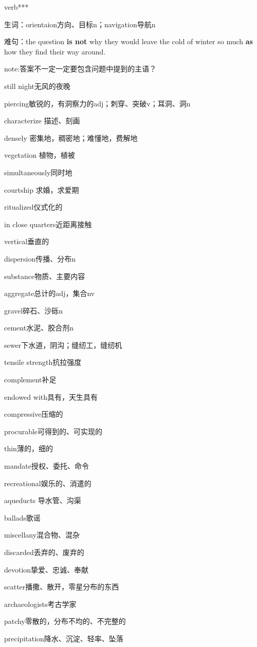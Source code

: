 \documentclass[a4paper, 10pt]{article}
\begin{document}
verb***


生词：orientaion方向、目标n；navigation导航n

难句：the question\textbf{ is not} why they would leave the cold of winter so much\textbf{ as} how they find their way around. 




note:答案不一定一定要包含问题中提到的主语？

still night无风的夜晚

piercing敏锐的，有洞察力的adj；刺穿、突破v；耳洞、洞n

characterize 描述、刻画

densely 密集地，稠密地；难懂地，费解地

vegetation 植物，植被

simultaneously同时地

courtship 求婚，求爱期

ritualized仪式化的

in close quarters近距离接触

vertical垂直的

dispersion传播、分布n

substance物质、主要内容

aggregate总计的adj，集合nv

gravel碎石、沙砾n

cement水泥、胶合剂n

sewer下水道，阴沟；缝纫工，缝纫机

tensile strength抗拉强度

complement补足

endowed with具有，天生具有

compressive压缩的

procurable可得到的、可实现的

thin薄的，细的

mandate授权、委托、命令

recreational娱乐的、消遣的

aqueducts 导水管、沟渠

ballads歌谣

miscellany混合物、混杂

discarded丢弃的、废弃的

devotion挚爱、忠诚、奉献

scatter播撒、散开，零星分布的东西

archaeologists考古学家

patchy零散的，分布不均的、不完整的

precipitation降水、沉淀、轻率、坠落
\end{document}
